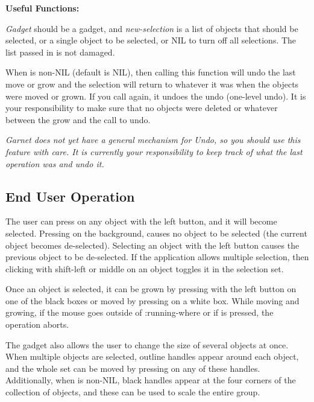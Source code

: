 {\bf Useful Functions:}


{\it Gadget} should be a  gadget, and
{\it new-selection} is a list of objects that should be selected, or a single
object to be selected, or NIL to turn off all selections.  The list passed
in is not damaged.



When  is non-NIL (default is NIL), then calling this function
will undo the last move or grow and the selection will return to whatever it
was when the objects were moved or grown.  If you call 
again, it undoes the undo (one-level undo).  It is
your responsibility to make sure that no objects were deleted or
whatever between the grow and the call to undo.

{\it Garnet does not yet have a general mechanism for Undo, so you
should use this feature with care.  It is currently your
responsibility to keep track of what the last operation was and undo it.}



\subsection{End User Operation}

The user can press on any object with the left button, and it will
become selected.  Pressing on the background, causes no object to be
selected (the current object becomes de-selected).  Selecting an object
with the left button causes the previous object to be de-selected.
If the application allows multiple selection, then clicking with
shift-left or middle on an object toggles it in the selection set.

Once an object is selected, it can be grown by pressing with the left
button on one of the black boxes or moved by pressing on a white box.
While moving and growing, if the mouse goes outside of :running-where
or if  is pressed, the operation aborts.

The gadget also allows the user to change the size of several objects
at once.  When multiple objects are selected, outline handles
appear around each object, and the whole set can be moved by
pressing on any of these handles.  Additionally, when 
is non-NIL, black handles appear at the four corners of the collection of objects, and these can be used to scale the entire group.

